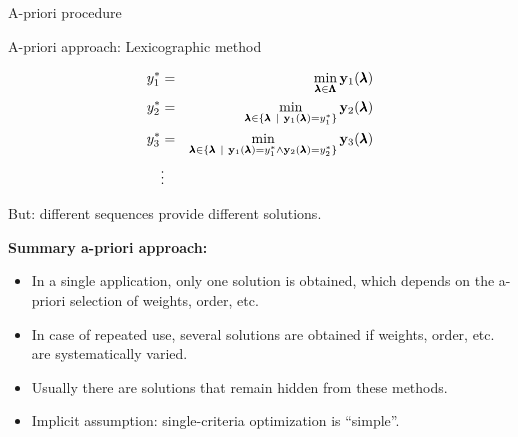 \begin{frame}[allowframebreaks]{A-priori procedure}
\framebreak

A-priori approach: Lexicographic method

\begin{eqnarray*}
y_1^* &=& \min_{\pmb{\lambda} \in \pmb{\Lambda}} \mathbf{y}_1(\pmb{\lambda})\\
y_2^* &=& \min_{\pmb{\lambda} \in \{\pmb{\lambda} ~|~ \mathbf{y}_1(\pmb{\lambda}) = y_1^*\}} \mathbf{y}_2(\pmb{\lambda}) \\
y_3^* &=& \min_{\pmb{\lambda} \in \{\pmb{\lambda} ~|~ \mathbf{y}_1(\pmb{\lambda}) = y_1^* \land \mathbf{y}_2(\pmb{\lambda}) = y_2^*\}} \mathbf{y}_3(\pmb{\lambda}) \\
&\vdots&
\end{eqnarray*}

But: different sequences provide different solutions.

\framebreak

\textbf{Summary a-priori approach:}
\begin{itemize}
\item In a single application, only one solution is obtained, which depends on the a-priori selection of weights, order, etc.
\item In case of repeated use, several solutions are obtained if weights, order, etc. are systematically varied.
\item Usually there are solutions that remain hidden from these methods.
\item Implicit assumption: single-criteria optimization is \enquote{simple}.
\end{itemize}

\end{frame}

